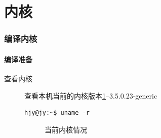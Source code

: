 \part{内核}
\section{编译内核}
\subsection{编译准备}
\begin{description}
\item[查看内核]	查看本机当前的内核版本\ref{fig:subfig1}--3.5.0.23-generic
\begin{lstlisting}[style=BASH]
hjy@jy:~$ uname -r
\end{lstlisting}
\begin{figure}[!htbp]
	\centering
	\caption{当前内核情况}
    	\label{fig:subfig1}
\end{figure}


\end{description}
